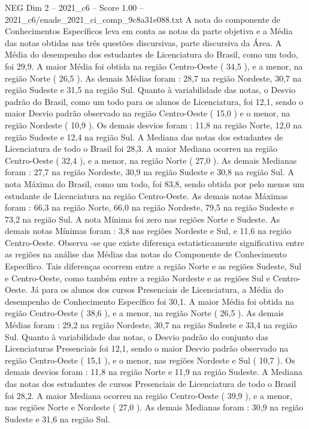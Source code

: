 \begin{textsample}{NEG Dim 2 – 2021\_c6 – Score 1.00 – 2021\_c6/enade\_2021\_ci\_comp\_9c8a31e088.txt}
A nota do componente de Conhecimentos Específicos leva em conta as notas da parte objetiva e a Média das notas obtidas nas três questões discursivas, parte discursiva da Área.
A Média do desempenho dos estudantes de Licenciatura do Brasil, como um todo, foi 29,9.
A maior Média foi obtida na região Centro-Oeste ( 34,5 ), e a menor, na região Norte ( 26,5 ).
As demais Médias foram : 28,7 na região Nordeste, 30,7 na região Sudeste e 31,5 na região Sul.
Quanto à variabilidade das notas, o Desvio padrão do Brasil, como um todo para os alunos de Licenciatura, foi 12,1, sendo o maior Desvio padrão observado na região Centro-Oeste ( 15,0 ) e o menor, na região Nordeste ( 10,9 ).
Os demais desvios foram : 11,8 na região Norte, 12,0 na região Sudeste e 12,4 na região Sul.
A Mediana das notas dos estudantes de Licenciatura de todo o Brasil foi 28,3.
A maior Mediana ocorreu na região Centro-Oeste ( 32,4 ), e a menor, na região Norte ( 27,0 ).
As demais Medianas foram : 27,7 na região Nordeste, 30,9 na região Sudeste e 30,8 na região Sul.
A nota Máxima do Brasil, como um todo, foi 83,8, sendo obtida por pelo menos um estudante de Licenciatura na região Centro-Oeste.
As demais notas Máximas foram : 66,3 na região Norte, 66,0 na região Nordeste, 79,5 na região Sudeste e 73,2 na região Sul.
A nota Mínima foi zero nas regiões Norte e Sudeste.
As demais notas Mínimas foram : 3,8 nas regiões Nordeste e Sul, e 11,6 na região Centro-Oeste.
Observa -se que existe diferença estatisticamente significativa entre as regiões na análise das Médias das notas do Componente de Conhecimento Específico.
Tais diferenças ocorrem entre a região Norte e as regiões Sudeste, Sul e Centro-Oeste, como também entre a região Nordeste e as regiões Sul e Centro-Oeste.
Já para os alunos dos cursos Presenciais de Licenciatura, a Média do desempenho de Conhecimento Específico foi 30,1.
A maior Média foi obtida na região Centro-Oeste ( 38,6 ), e a menor, na região Norte ( 26,5 ).
As demais Médias foram : 29,2 na região Nordeste, 30,7 na região Sudeste e 33,4 na região Sul.
Quanto à variabilidade das notas, o Desvio padrão do conjunto das Licenciaturas Presenciais foi 12,1, sendo o maior Desvio padrão observado na região Centro-Oeste ( 15,1 ), e o menor, nas regiões Nordeste e Sul ( 10,7 ).
Os demais desvios foram : 11,8 na região Norte e 11,9 na região Sudeste.
A Mediana das notas dos estudantes de cursos Presenciais de Licenciatura de todo o Brasil foi 28,2.
A maior Mediana ocorreu na região Centro-Oeste ( 39,9 ), e a menor, nas regiões Norte e Nordeste ( 27,0 ).
As demais Medianas foram : 30,9 na região Sudeste e 31,6 na região Sul.

\end{textsample}

